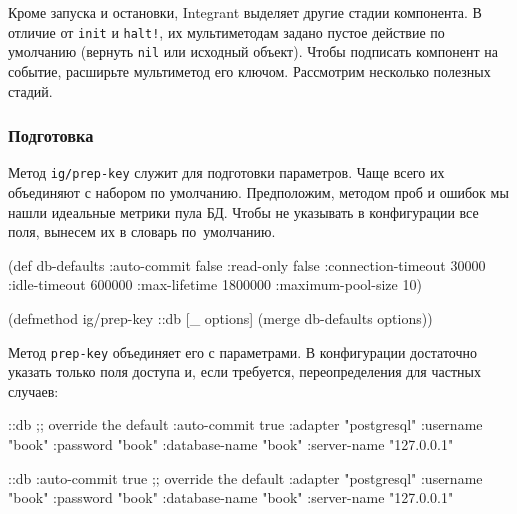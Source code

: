 
Кроме запуска и остановки, Integrant выделяет другие стадии компонента. В
отличие от \verb|init| и \verb|halt!|, их мультиметодам задано пустое действие
по умолчанию (вернуть \verb|nil| или исходный объект). Чтобы подписать компонент
на событие, расширьте мультиметод его ключом. Рассмотрим несколько полезных
стадий.

\subsubsection{Подготовка}

Метод \verb|ig/prep-key| служит для подготовки параметров. Чаще всего их
объединяют с набором по умолчанию. Предположим, методом проб и ошибок мы нашли
идеальные метрики пула БД. Чтобы не указывать в конфигурации все поля, вынесем
их в словарь по~умолчанию.

\ifafive\vspace{10mm}\pagebreak[4]\fi

\begin{english}
  \begin{clojure}
(def db-defaults
  {:auto-commit        false
   :read-only          false
   :connection-timeout 30000
   :idle-timeout       600000
   :max-lifetime       1800000
   :maximum-pool-size  10})

(defmethod ig/prep-key ::db
  [_ options]
  (merge db-defaults options))
  \end{clojure}
\end{english}

Метод \verb|prep-key| объединяет его с параметрами. В конфигурации достаточно
указать только поля доступа и, если требуется, переопределения для частных
случаев:

\ifnarrow

\begin{english}
  \begin{clojure}
{::db {;; override the default
       :auto-commit   true
       :adapter       "postgresql"
       :username      "book"
       :password      "book"
       :database-name "book"
       :server-name   "127.0.0.1"}}
  \end{clojure}
\end{english}

\else

\begin{english}
  \begin{clojure}
{::db {:auto-commit   true ;; override the default
       :adapter       "postgresql"
       :username      "book"
       :password      "book"
       :database-name "book"
       :server-name   "127.0.0.1"}}
  \end{clojure}
\end{english}

